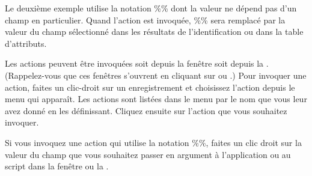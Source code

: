 Le deuxième exemple utilise la notation \%\% dont la valeur ne dépend pas d'un champ en particulier. Quand l'action est invoquée, \%\% sera remplacé par la valeur du champ sélectionné dans les résultats de l'identification ou dans la table d'attributs.

\label{label_usingactions}
Les actions peuvent être invoquées soit depuis la fenêtre  soit depuis la . (Rappelez-vous que ces fenêtres s'ouvrent en cliquant sur  ou .)
Pour invoquer une action, faites un clic-droit sur un enregistrement et choisissez l'action depuis le menu qui apparaît. Les actions sont listées dans le menu par le nom que vous leur avez donné en les définissant. Cliquez ensuite sur l'action que vous souhaitez invoquer.

Si vous invoquez une action qui utilise la notation \%\%, faites un clic droit sur la valeur du champ que vous souhaitez passer en argument à l'application ou au script dans la fenêtre  ou la .

